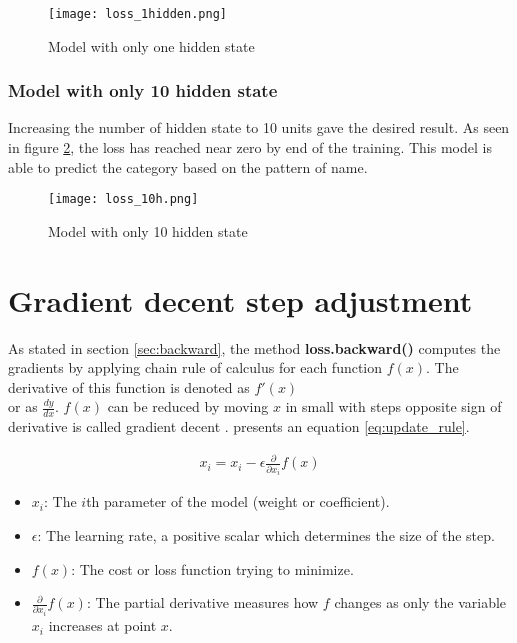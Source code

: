 \begin{figure}[H]
    \centering    
    \texttt{[image: loss\_1hidden.png]}
    \caption{Model with only one hidden state}
    \label{fig:unihidden}
\end{figure}

\subsubsection*{Model with only 10 hidden state}
Increasing the number of hidden state to 10 units gave the desired result.  As seen in figure \ref{fig:10hidden}, the loss has reached near zero by end of the training. This model is able to predict the category based on the pattern of name.
\begin{figure}[H]
    \centering    
    \texttt{[image: loss\_10h.png]}
    \caption{Model with only 10 hidden state}
    \label{fig:10hidden}
\end{figure}

\section{Gradient decent step adjustment}

As stated in section \ref{sec:backward}, the method \textbf{loss.backward()} computes the gradients by applying chain rule of calculus for each function $f(x)$. The derivative of this function is denoted as $f'(x)$ \\ or as $\frac{dy}{dx}$. $f(x)$ can be reduced by moving $x$ in small with steps opposite sign of derivative is called gradient decent \parencite{cauchy}.  \parencite[section 4.3]{Goodfellow-et-al-2016} presents an equation \ref{eq:update_rule}.

\begin{align}
    x_i = x_i - \epsilon \frac{\partial}{\partial x_i} f(x) \label{eq:update_rule}
\end{align}

\begin{itemize}
    \item \( x_i \): The \(i\)th parameter of the model (weight or coefficient).
    \item \( \epsilon \): The learning rate, a positive scalar which determines the size of the step.
    \item \( f(x) \): The cost or loss function trying to minimize.
    \item \( \frac{\partial}{\partial x_i} f(x)\): The partial derivative  measures how \( f \) changes as only the variable \( x_i \) increases at point  \( x \).
\end{itemize}


